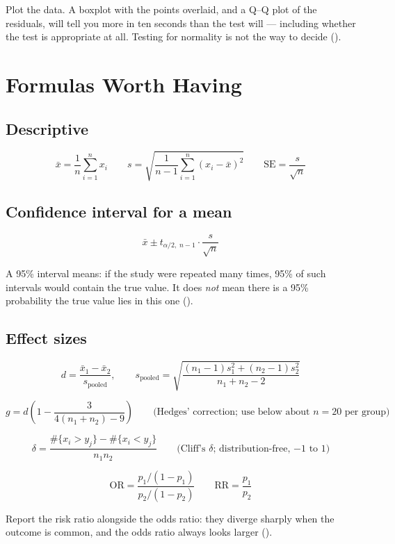 \begin{alertbox}
Plot the data. A boxplot with the points overlaid, and a Q--Q plot of the
residuals, will tell you more in ten seconds than the test will --- including
whether the test is appropriate at all. Testing for normality is not the way to
decide ().
\end{alertbox}

\section{Formulas Worth Having}

\subsection*{Descriptive}

\[
\bar{x} = \frac{1}{n}\sum_{i=1}^{n} x_i
\qquad
s = \sqrt{\frac{1}{n-1}\sum_{i=1}^{n}(x_i - \bar{x})^2}
\qquad
\mathrm{SE} = \frac{s}{\sqrt{n}}
\]

\subsection*{Confidence interval for a mean}

\[
\bar{x} \pm t_{\alpha/2,\;n-1}\cdot \frac{s}{\sqrt{n}}
\]

\noindent A 95\% interval means: if the study were repeated many times, 95\% of
such intervals would contain the true value. It does \emph{not} mean there is a
95\% probability the true value lies in this one ().

\subsection*{Effect sizes}

\[
d = \frac{\bar{x}_1 - \bar{x}_2}{s_{\text{pooled}}},
\qquad
s_{\text{pooled}} = \sqrt{\frac{(n_1-1)s_1^2 + (n_2-1)s_2^2}{n_1+n_2-2}}
\]

\[
g = d\left(1 - \frac{3}{4(n_1+n_2)-9}\right)
\qquad\text{(Hedges' correction; use below about $n=20$ per group)}
\]

\[
\delta = \frac{\#\{x_i > y_j\} - \#\{x_i < y_j\}}{n_1 n_2}
\qquad\text{(Cliff's $\delta$; distribution-free, $-1$ to $1$)}
\]

\[
\text{OR} = \frac{p_1/(1-p_1)}{p_2/(1-p_2)}
\qquad
\text{RR} = \frac{p_1}{p_2}
\]

\noindent Report the risk ratio alongside the odds ratio: they diverge sharply
when the outcome is common, and the odds ratio always looks larger
().

